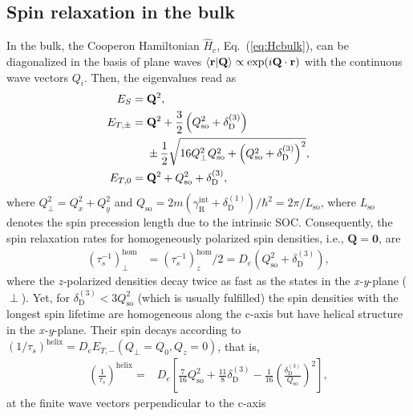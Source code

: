 \documentclass[superscriptaddress,noshowpacs,noshowkeys, twocolumn, floatfix,aps, prb,reprint]{revtex4-1}
\begin{document}
\subsection{Spin relaxation in the bulk}

In the bulk, the Cooperon Hamiltonian $\hat{H}_c$, Eq.~(\ref{eq:Hcbulk}),  can be diagonalized in the basis of plane waves ${\braket{\mathbf{r}|\mathbf{Q}}\propto\exp(i \mathbf{Q}\cdot\mathbf{r})}$ with the continuous wave vectors $Q_i$.
Then, the eigenvalues read as
%
\begin{align}
E_S={}&\mathbf{Q}^2,\label{bulk_eigenvalue_singlet}\\
E_{T,\pm}={}&\mathbf{Q}^2+\frac{3}{2}\left(Q_\text{so}^2+\delta_\text{D}^{(3)}\right)\notag\\
&\pm\frac{1}{2}\sqrt{16 Q_\perp^2 Q_\text{so}^2+\left(Q_\text{so}^2+\delta_\text{D}^{(3)}\right)^2},\label{bulk_eigenvalue_pm}\\
E_{T,0}={}&\mathbf{Q}^2+Q_\text{so}^2+\delta_\text{D}^{(3)},\label{bulk_eigenvalue_0}
\end{align}
%
where $Q_\perp^2=Q_x^2+Q_y^2$  and  $Q_\text{so}=2m(\gamma_\text{R}^\text{int}+\delta_\text{D}^{(1)})/\hbar^2=2\pi/L_\text{so}$, where $L_\text{so}$ denotes the spin precession length due to the intrinsic SOC.
Consequently, the spin relaxation rates for homogeneously polarized spin densities, i.e., $\mathbf{Q}=\mathbf{0}$, are
%
\begin{align}
\left(\tau_s^{-1}\right)_\perp^\text{hom}{}&=\left(\tau_s^{-1}\right)_{z}^\text{hom}/2=D_e (Q_\text{so}^2+\delta_\text{D}^{(3)}),
\label{eq:hom_bulk_rate}
\end{align} 
%
where the \textit{z-}polarized densities decay twice as fast as the states in the \textit{x-y}-plane ($\perp$).
Yet, for $\delta_\text{D}^{(3)}<3Q_\text{so}^2$ (which is usually fulfilled) the spin densities with the longest spin lifetime are homogeneous along the c-axis but have helical structure in the \textit{x-y}-plane.
Their spin decays according to $(1/\tau_s)^\text{helix}=D_e {E_{T,-}(Q_\perp=Q_0,Q_z=0)}$, that is,
\begin{align}
\left(\frac{1}{\tau_s}\right)^\text{helix}={}&D_e\left[\frac{7}{16}Q_\text{so}^2+\frac{11}{8}\delta_\text{D}^{(3)}-\frac{1}{16}\left(\frac{\delta_\text{D}^{(3)}}{Q_\text{so}}\right)^2\right],
\label{eq:helix_bulk_rate}
\end{align}
at the finite wave vectors perpendicular to the c-axis 
\end{document}
